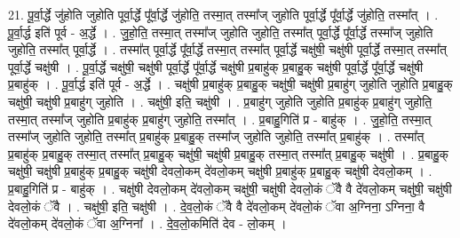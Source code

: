 \documentclass[17pt]{extarticle}
\begin{document}
21. पू॒र्वा॒र्द्धे जु॑होति जुहोति पूर्वा॒र्द्धे पू᳚र्वा॒र्द्धे जु॑होति॒ तस्मा॒त् तस्मा᳚ज् जुहोति पूर्वा॒र्द्धे पू᳚र्वा॒र्द्धे जु॑होति॒ तस्मा᳚त् । . पू॒र्वा॒र्द्ध इति॑ पूर्व - अ॒र्द्धे । . जु॒हो॒ति॒ तस्मा॒त् तस्मा᳚ज् जुहोति जुहोति॒ तस्मा᳚त् पूर्वा॒र्द्धे पू᳚र्वा॒र्द्धे तस्मा᳚ज् जुहोति जुहोति॒ तस्मा᳚त् पूर्वा॒र्द्धे । . तस्मा᳚त् पूर्वा॒र्द्धे पू᳚र्वा॒र्द्धे तस्मा॒त् तस्मा᳚त् पूर्वा॒र्द्धे चक्षु॑षी॒ चक्षु॑षी पूर्वा॒र्द्धे तस्मा॒त् तस्मा᳚त् पूर्वा॒र्द्धे चक्षु॑षी । . पू॒र्वा॒र्द्धे चक्षु॑षी॒ चक्षु॑षी पूर्वा॒र्द्धे पू᳚र्वा॒र्द्धे चक्षु॑षी प्र॒बाहु॑क् प्र॒बाहु॒क् चक्षु॑षी पूर्वा॒र्द्धे 
पू᳚र्वा॒र्द्धे चक्षु॑षी प्र॒बाहु॑क् । . पू॒र्वा॒र्द्ध इति॑ पूर्व - अ॒र्द्धे । . चक्षु॑षी प्र॒बाहु॑क् प्र॒बाहु॒क् चक्षु॑षी॒ चक्षु॑षी प्र॒बाहु॑ग् जुहोति जुहोति प्र॒बाहु॒क् चक्षु॑षी॒ चक्षु॑षी प्र॒बाहु॑ग् जुहोति । . चक्षु॑षी॒ इति॒ चक्षु॑षी । . प्र॒बाहु॑ग् जुहोति जुहोति प्र॒बाहु॑क् प्र॒बाहु॑ग् जुहोति॒ तस्मा॒त् तस्मा᳚ज् जुहोति प्र॒बाहु॑क् प्र॒बाहु॑ग् जुहोति॒ तस्मा᳚त् । . प्र॒बाहु॒गिति॑ प्र - बाहु॑क् । . जु॒हो॒ति॒ तस्मा॒त् तस्मा᳚ज् जुहोति जुहोति॒ तस्मा᳚त् प्र॒बाहु॑क् प्र॒बाहु॒क् तस्मा᳚ज् जुहोति जुहोति॒ तस्मा᳚त् प्र॒बाहु॑क् । . तस्मा᳚त् प्र॒बाहु॑क् प्र॒बाहु॒क् तस्मा॒त् तस्मा᳚त् प्र॒बाहु॒क् चक्षु॑षी॒ चक्षु॑षी प्र॒बाहु॒क् तस्मा॒त् तस्मा᳚त् प्र॒बाहु॒क् चक्षु॑षी । . प्र॒बाहु॒क् चक्षु॑षी॒ चक्षु॑षी प्र॒बाहु॑क् प्र॒बाहु॒क् चक्षु॑षी देवलो॒कम् दे॑वलो॒कम् चक्षु॑षी प्र॒बाहु॑क् प्र॒बाहु॒क् चक्षु॑षी देवलो॒कम् । . प्र॒बाहु॒गिति॑ प्र - बाहु॑क् । . चक्षु॑षी देवलो॒कम् दे॑वलो॒कम् चक्षु॑षी॒ चक्षु॑षी देवलो॒कं ॅवै वै दे॑वलो॒कम् चक्षु॑षी॒ चक्षु॑षी देवलो॒कं ॅवै । . चक्षु॑षी॒ इति॒ चक्षु॑षी । . दे॒व॒लो॒कं ॅवै वै दे॑वलो॒कम् दे॑वलो॒कं ॅवा अ॒ग्निना॒ ऽग्निना॒ वै दे॑वलो॒कम् दे॑वलो॒कं ॅवा अ॒ग्निना᳚ । . दे॒व॒लो॒कमिति॑ देव - लो॒कम् । \newline
\end{document}
